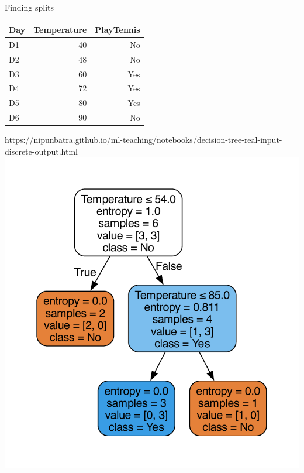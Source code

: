 \documentclass[usenames,dvipsnames]{beamer}
\begin{document}
				\begin{frame}{Finding splits}
					\begin{table}[]
						\begin{tabular}{@{}lrr@{}}
							\toprule
							\textbf{Day} & \textbf{Temperature} & \textbf{PlayTennis} \\ \midrule
							D1           & 40                   & No                  \\
							D2           & 48                   & No                  \\
							D3           & 60                   & Yes                 \\
							D4           & 72                   & Yes                 \\
							D5           & 80                   & Yes                 \\
							D6           & 90                   & No                  \\ \bottomrule
						\end{tabular}
					\end{table}
					\begin{notebookbox}{https://nipunbatra.github.io/ml-teaching/notebooks/decision-tree-real-input-discrete-output.html}
						\includegraphics[scale=0.25]{../assets/decision-trees/figures/real-ip-2.pdf}
					\end{notebookbox}
					\end{frame}
\end{document}
